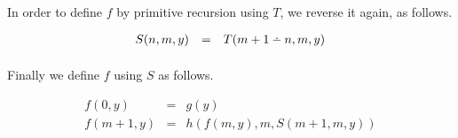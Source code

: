\documentclass{article}
\providecommand{\dotdiv}{%
  \mathbin{%
    \vphantom{+}%
    \text{%
      \mathsurround=0pt %
      \ooalign{%
        \noalign{\kern-.35ex}%
        \hidewidth$\smash{\cdot}$\hidewidth\cr %
        \noalign{\kern.35ex}%
        $-$\cr %
      }%
    }%
  }%
}
\begin{document}
\paragraph{} In order to define $f$ by primitive recursion using $T$, we reverse it again, as follows.

\[
\begin{array}{rcl}
  S(n,m,y) & = & T(m+1 \dotdiv n, m, y)
\end{array} 
\]


\paragraph{} Finally we define $f$ using $S$ as follows.

\[
\begin{array}{rcl}
  f(0,y) & = & g(y) \\
  f(m+1,y) & = & h(f(m,y), m , S(m+1,m,y))
\end{array} 
\]
\end{document}
